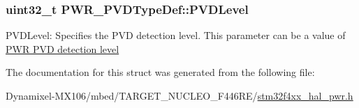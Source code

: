 \subsubsection[{\texorpdfstring{P\+V\+D\+Level}{PVDLevel}}]{\setlength{\rightskip}{0pt plus 5cm}uint32\+\_\+t P\+W\+R\+\_\+\+P\+V\+D\+Type\+Def\+::\+P\+V\+D\+Level}\hypertarget{struct_p_w_r___p_v_d_type_def_a540471bc6ac947fd8bc2c87f61d9faab}{}\label{struct_p_w_r___p_v_d_type_def_a540471bc6ac947fd8bc2c87f61d9faab}
P\+V\+D\+Level\+: Specifies the P\+VD detection level. This parameter can be a value of \hyperlink{group___p_w_r___p_v_d__detection__level}{P\+WR P\+VD detection level} 

The documentation for this struct was generated from the following file\+:\begin{DoxyCompactItemize}
\item 
Dynamixel-\/\+M\+X106/mbed/\+T\+A\+R\+G\+E\+T\+\_\+\+N\+U\+C\+L\+E\+O\+\_\+\+F446\+R\+E/\hyperlink{stm32f4xx__hal__pwr_8h}{stm32f4xx\+\_\+hal\+\_\+pwr.\+h}\end{DoxyCompactItemize}
